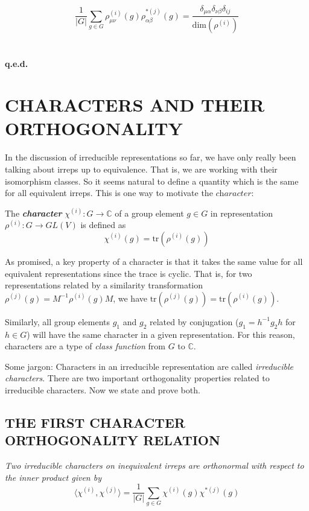 \documentclass[9 pt]{report}
\begin{document}
$$	\frac{1}{|G|}\sum_{g\in G} \rho^{(i)}_{\mu\nu}(g)\rho^{*(j)}_{\alpha\beta} (g) = \frac{\delta_{\mu\alpha}\delta_{\nu\beta}\delta_{ij}}{\text{dim}(\rho^{(i)})} $$
\\
\\
\textbf{q.e.d.}
    
{\centering
\section*{CHARACTERS AND THEIR ORTHOGONALITY}}
In the discussion of irreducible representations so far, we have only really been talking about irreps up to equivalence. That is, we are working with their isomorphism classes. So it seems natural to define a quantity which is the same for all equivalent irreps. This is one way to motivate the $\textit{character}$:

\begin{tcolorbox}
	The \textbf{\textit{character}} $\chi^{(i)}:G\to \mathbb{C}$ of a group element $g\in G$ in  representation $\rho^{(i)}:G\to GL(V)$ is defined as
	$$ \chi^{(i)}(g)=\text{tr} (\rho^{(i)}(g)) $$
\end{tcolorbox}

As promised, a key property of a character is that it takes the same value for all equivalent representations since the trace is cyclic. That is, for two representations related by a similarity transformation $\rho^{(j)}(g) = M^{-1}\rho^{(i)}(g)M$, we have $ \text{tr}(\rho^{(j)}(g)) =\text{tr}(\rho^{(i)}(g))$. 

Similarly, all group elements $g_1$ and $g_2$ related by conjugation ($g_1 = h^{-1}g_2 h$ for $h \in G$) will have the same character in a given representation. For this reason, characters are a type of \textit{class function} from $G$ to $\mathbb{C}$.

Some jargon: Characters in an irreducible representation are called \textit{irreducible characters}. There are two important orthogonality properties related to irreducible characters. Now we state and prove both.
\\

{\centering
\subsection*{THE FIRST CHARACTER ORTHOGONALITY RELATION}}

\begin{tcolorbox}
\textit{Two irreducible characters on inequivalent irreps are orthonormal with respect to the inner product given by}
$$ \langle \chi^{(i)}, \chi^{(j)} \rangle = \frac{1}{|G|}\sum_{g\in G}\chi^{(i)}(g)\chi^{*(j)}(g) $$
\end{tcolorbox}
\end{document}
